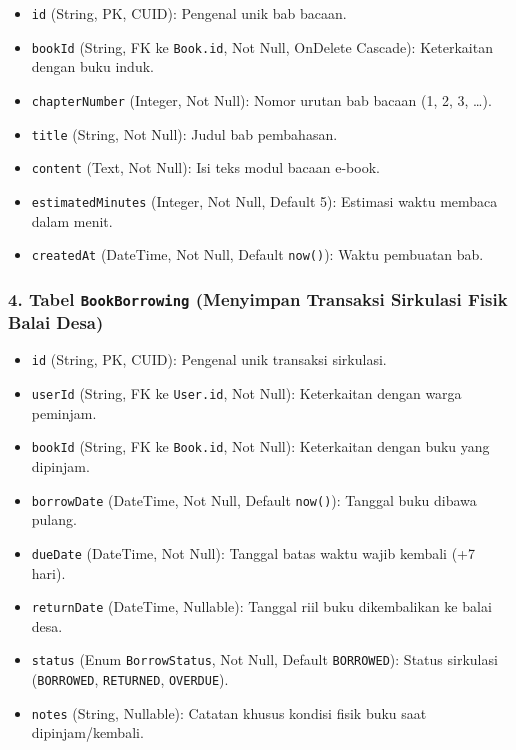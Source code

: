 \documentclass[
  indonesian,
  12pt,
]{report}
\providecommand{\tightlist}{%
  \setlength{\itemsep}{0pt}\setlength{\parskip}{0pt}}
\begin{document}
\begin{itemize}
\tightlist
\item
  \texttt{id} (String, PK, CUID): Pengenal unik bab bacaan.
\item
  \texttt{bookId} (String, FK ke \texttt{Book.id}, Not Null, OnDelete
  Cascade): Keterkaitan dengan buku induk.
\item
  \texttt{chapterNumber} (Integer, Not Null): Nomor urutan bab bacaan
  (1, 2, 3, \ldots).
\item
  \texttt{title} (String, Not Null): Judul bab pembahasan.
\item
  \texttt{content} (Text, Not Null): Isi teks modul bacaan e-book.
\item
  \texttt{estimatedMinutes} (Integer, Not Null, Default 5): Estimasi
  waktu membaca dalam menit.
\item
  \texttt{createdAt} (DateTime, Not Null, Default \texttt{now()}): Waktu
  pembuatan bab.
\end{itemize}

\subsubsection{\texorpdfstring{4. Tabel \texttt{BookBorrowing}
(Menyimpan Transaksi Sirkulasi Fisik Balai
Desa)}{4. Tabel BookBorrowing (Menyimpan Transaksi Sirkulasi Fisik Balai Desa)}}\label{tabel-bookborrowing-menyimpan-transaksi-sirkulasi-fisik-balai-desa}

\begin{itemize}
\tightlist
\item
  \texttt{id} (String, PK, CUID): Pengenal unik transaksi sirkulasi.
\item
  \texttt{userId} (String, FK ke \texttt{User.id}, Not Null):
  Keterkaitan dengan warga peminjam.
\item
  \texttt{bookId} (String, FK ke \texttt{Book.id}, Not Null):
  Keterkaitan dengan buku yang dipinjam.
\item
  \texttt{borrowDate} (DateTime, Not Null, Default \texttt{now()}):
  Tanggal buku dibawa pulang.
\item
  \texttt{dueDate} (DateTime, Not Null): Tanggal batas waktu wajib
  kembali (+7 hari).
\item
  \texttt{returnDate} (DateTime, Nullable): Tanggal riil buku
  dikembalikan ke balai desa.
\item
  \texttt{status} (Enum \texttt{BorrowStatus}, Not Null, Default
  \texttt{BORROWED}): Status sirkulasi (\texttt{BORROWED},
  \texttt{RETURNED}, \texttt{OVERDUE}).
\item
  \texttt{notes} (String, Nullable): Catatan khusus kondisi fisik buku
  saat dipinjam/kembali.
\end{itemize}
\end{document}
